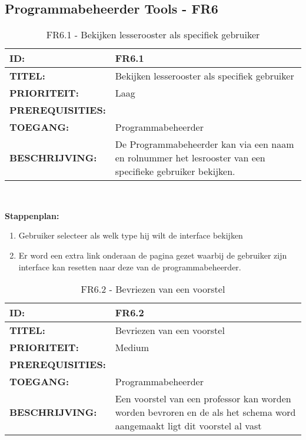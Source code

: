 \subsection{Programmabeheerder Tools - FR6}

\noindent\begin{table}[H]
            \begin{tabular}{l | p{10cm}}
                \textbf{ID:} & FR6.1 \\ \hline
                \textbf{TITEL:} & Bekijken lesserooster als specifiek gebruiker\\ \hline
                \textbf{PRIORITEIT:} &  Laag \\ \hline
                \textbf{PREREQUISITIES:} & \\ \hline
                \textbf{TOEGANG:} & Programmabeheerder \\ \hline
                \textbf{BESCHRIJVING:} & De Programmabeheerder kan via een naam en rolnummer het lesrooster van een specifieke gebruiker bekijken. \\ 
            \end{tabular}\\
            \caption{FR6.1 - Bekijken lesserooster als specifiek gebruiker}
            \label{tab:FR6.1 - Bekijken lesserooster als specifiek gebruiker}
        \end{table}
        
\textbf{Stappenplan:}
	\begin{enumerate}
	\item Gebruiker selecteer als welk type hij wilt de interface bekijken
	\item Er word een extra link onderaan de pagina gezet waarbij de gebruiker zijn interface kan resetten naar deze van de programmabeheerder.
	\end{enumerate}
        
\noindent\begin{table}[H]
            \begin{tabular}{l | p{10cm}}
                \textbf{ID:} & FR6.2 \\ \hline
                \textbf{TITEL:} & Bevriezen van een voorstel\\ \hline
                \textbf{PRIORITEIT:} &  Medium \\ \hline
                \textbf{PREREQUISITIES:} & \\ \hline
                \textbf{TOEGANG:} & Programmabeheerder \\ \hline
                \textbf{BESCHRIJVING:} & Een voorstel van een professor kan worden worden bevroren en de als het schema word aangemaakt ligt dit voorstel al vast\\ 
            \end{tabular}\\
            \caption{FR6.2 - Bevriezen van een voorstel}
            \label{tab:FR6.2 - Bevriezen van een voorstel}
        \end{table}
        
